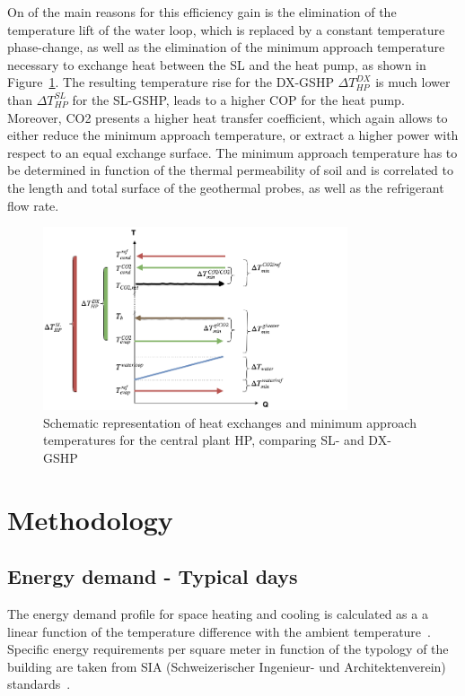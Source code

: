 \documentclass{article}
\begin{document}
On of the main reasons for this efficiency gain is the elimination of the temperature lift of the water loop, which is replaced by a constant temperature phase-change, as well as the elimination of the minimum approach temperature necessary to exchange heat between the SL and the heat pump, as shown in Figure~\ref{fig:Qt_dx}. The resulting temperature rise for the DX-GSHP $\Delta T_{HP}^{DX}$ is much lower than $\Delta T_{HP}^{SL}$ for the SL-GSHP, leads to a higher COP for the heat pump. 
Moreover, CO2 presents a higher heat transfer coefficient, which again allows to either reduce the minimum approach temperature, or extract a higher power with respect to an equal exchange surface. The minimum approach temperature has to be determined in function of the thermal permeability of soil and is correlated to the length and total surface of the geothermal probes, as well as the refrigerant flow rate.

\begin{figure}[htp]
	\centering
	\includegraphics[width=0.8\textwidth]{Qt_dx.png}
	\caption{Schematic representation of heat exchanges and minimum approach temperatures for the central plant HP, comparing SL- and DX-GSHP}
	\label{fig:Qt_dx}
\end{figure}

\clearpage
\newpage
\section{Methodology}

\subsection{Energy demand - Typical days}\label{ss:typicalDays}
The energy demand profile for space heating and cooling is calculated as a a linear function of the temperature difference with the ambient temperature~\cite{girardinEnerGisGeographicalInformation2010}. Specific energy requirements per square meter in function of the typology of the building are taken from SIA (Schweizerischer Ingenieur- und Architektenverein) standards~\cite{siaSIA38020162016}.\\
\end{document}
